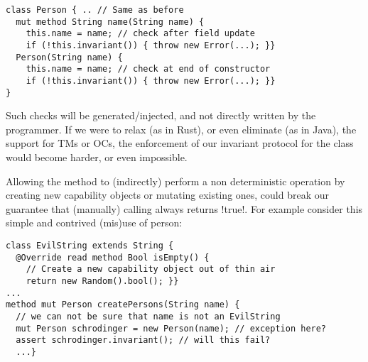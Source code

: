 \begin{lstlisting}
class Person { .. // Same as before
  mut method String name(String name) {
    this.name = name; // check after field update
    if (!this.invariant()) { throw new Error(...); }}
  Person(String name) {
    this.name = name; // check at end of constructor
    if (!this.invariant()) { throw new Error(...); }}
}
\end{lstlisting}
%

Such checks will be generated/injected, and not directly written by the programmer. If we were to relax (as in Rust), or even eliminate (as in Java), the support for TMs or OCs, the enforcement of our invariant protocol for the \Q@Person@ class would become harder, or even impossible. 

 Allowing the \Q@invariant@ method to (indirectly) perform a non deterministic operation by creating new capability objects or mutating existing ones, could break our guarantee that (manually) calling \Q@invariant@ always returns \Q!true!.
% 
For example consider this simple and contrived (mis)use of person:
\begin{lstlisting}[morekeywords={assert}]
class EvilString extends String {
  @Override read method Bool isEmpty() {
    // Create a new capability object out of thin air
    return new Random().bool(); }}
...
method mut Person createPersons(String name) {
  // we can not be sure that name is not an EvilString
  mut Person schrodinger = new Person(name); // exception here?
  assert schrodinger.invariant(); // will this fail?
  ...}
\end{lstlisting}

